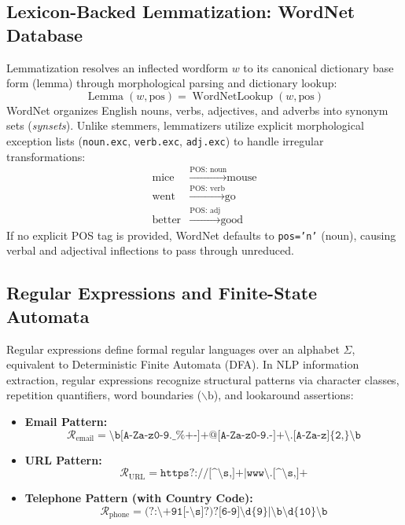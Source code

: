 \documentclass[12pt,a4paper]{report}
\begin{document}
\subsection{Lexicon-Backed Lemmatization: WordNet Database}
Lemmatization resolves an inflected wordform $w$ to its canonical dictionary base form (lemma) through morphological parsing and dictionary lookup:
\begin{equation}
    \operatorname{Lemma}(w, \text{pos}) = \operatorname{WordNetLookup}(w, \text{pos})
\end{equation}
WordNet organizes English nouns, verbs, adjectives, and adverbs into synonym sets (\textit{synsets}). Unlike stemmers, lemmatizers utilize explicit morphological exception lists (\texttt{noun.exc}, \texttt{verb.exc}, \texttt{adj.exc}) to handle irregular transformations:
\begin{align}
    \text{mice} &\xrightarrow{\text{POS: noun}} \text{mouse} \\
    \text{went} &\xrightarrow{\text{POS: verb}} \text{go} \\
    \text{better} &\xrightarrow{\text{POS: adj}} \text{good}
\end{align}
If no explicit POS tag is provided, WordNet defaults to \texttt{pos='n'} (noun), causing verbal and adjectival inflections to pass through unreduced.

\subsection{Regular Expressions and Finite-State Automata}
Regular expressions define formal regular languages over an alphabet $\Sigma$, equivalent to Deterministic Finite Automata (DFA). In NLP information extraction, regular expressions recognize structural patterns via character classes, repetition quantifiers, word boundaries ($\backslash\text{b}$), and lookaround assertions:
\begin{itemize}
    \item \textbf{Email Pattern:} 
    \begin{equation}
        \mathcal{R}_{\text{email}} = \texttt{\textbackslash b[A-Za-z0-9.\_\%+-]+@[A-Za-z0-9.-]+\textbackslash.[A-Za-z]\{2,\}\textbackslash b}
    \end{equation}
    \item \textbf{URL Pattern:}
    \begin{equation}
        \mathcal{R}_{\text{URL}} = \texttt{https?://[\textasciicircum\textbackslash s,]+|www\textbackslash .[\textasciicircum\textbackslash s,]+}
    \end{equation}
    \item \textbf{Telephone Pattern (with Country Code):}
    \begin{equation}
        \mathcal{R}_{\text{phone}} = \texttt{(?:\textbackslash+91[-\textbackslash s]?)?[6-9]\textbackslash d\{9\}|\textbackslash b\textbackslash d\{10\}\textbackslash b}
    \end{equation}
\end{itemize}
\end{document}
